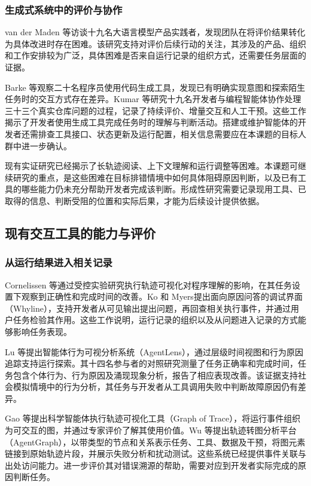 \subsubsection{生成式系统中的评价与协作}

van der Maden 等\cite{ref01}访谈十九名大语言模型产品实践者，发现团队在将评价结果转化为具体改进时存在困难。该研究支持对评价后续行动的关注，其涉及的产品、组织和工作安排较为广泛，具体困难是否来自运行记录的组织方式，还需要任务层面的证据。

Barke 等\cite{ref64}观察二十名程序员使用代码生成工具，发现已有明确实现意图和探索陌生任务时的交互方式存在差异。Kumar 等\cite{ref59}研究十九名开发者与编程智能体协作处理三十三个真实仓库问题的过程，记录了持续评价、增量交互和人工干预。这些工作揭示了开发者使用生成工具完成任务时的理解与判断活动。搭建或维护智能体的开发者还需排查工具接口、状态更新及运行配置，相关信息需要应在本课题的目标人群中进一步确认。

现有实证研究已经揭示了长轨迹阅读、上下文理解和运行调整等困难。本课题可继续研究的重点，是这些困难在目标排错情境中如何具体阻碍原因判断，以及已有工具的哪些能力仍未充分帮助开发者完成该判断。形成性研究需要记录现用工具、已取得的信息、判断受阻的位置和实际后果，才能为后续设计提供依据。

\subsection{现有交互工具的能力与评价}

\subsubsection{从运行结果进入相关记录}

Cornelissen 等\cite{ref33}通过受控实验研究执行轨迹可视化对程序理解的影响，在其任务设置下观察到正确性和完成时间的改善。Ko 和 Myers\cite{ref07}提出面向原因问答的调试界面（Whyline），支持开发者从可见输出提出问题，再回查相关执行事件，并通过用户任务检验其作用。这些工作说明，运行记录的组织以及从问题进入记录的方式能够影响任务表现。

Lu 等\cite{ref22}提出智能体行为可视分析系统（AgentLens），通过层级时间视图和行为原因追踪支持运行探索。其十四名参与者的对照研究测量了任务正确率和完成时间，任务包含个体行为、行为原因及涌现现象分析，报告了相应表现改善。该证据支持社会模拟情境中的行为分析，其任务与开发者从工具调用失败中判断故障原因仍有差异。

Gao 等\cite{ref24}提出科学智能体执行轨迹可视化工具（Graph of Trace），将运行事件组织为可交互的图，并通过专家评价了解其使用价值。Wu 等\cite{ref23}提出轨迹转图分析平台（AgentGraph），以带类型的节点和关系表示任务、工具、数据及干预，将图元素链接到原始轨迹片段，并展示失败分析和扰动测试。这些系统已经提供事件关联与出处访问能力。进一步评价其对错误溯源的帮助，需要对应到开发者实际完成的原因判断任务。

